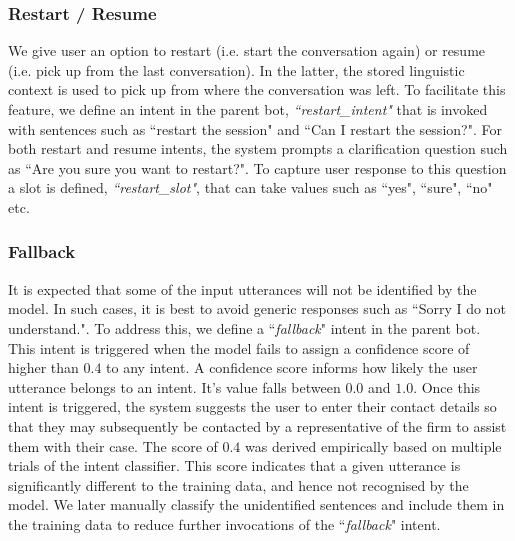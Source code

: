 \documentclass[runningheads]{llncs}
\begin{document}
\subsubsection{Restart / Resume}
We give user an option to restart (i.e. start the conversation again) or resume (i.e. pick up from the last conversation). In the latter, the stored linguistic context is used to pick up from where the conversation was left. To facilitate this feature, we define an intent in the parent bot, \textit{``restart\_intent"} that is invoked with sentences such as ``restart the session" and ``Can I restart the session?". For both restart and resume intents, the system prompts a clarification question such as ``Are you sure you want to restart?". To capture user response to this question a slot is defined, \textit{``restart\_slot"}, that can take values such as ``yes", ``sure", ``no" etc.

\subsubsection{Fallback}
It is expected that some of the input utterances will not be identified by the model. In such cases, it is best to avoid generic responses such as ``Sorry I do not understand.". To address this, we define a ``\textit{fallback}" intent in the parent bot. This intent is triggered when the model fails to assign a confidence score of higher than $0.4$ to any intent. A confidence score informs how likely the user utterance belongs to an intent. It's value falls between $0.0$ and $1.0$. Once this intent is triggered, the system suggests the user to enter their contact details so that they may subsequently be contacted by a representative of the firm to assist them with their case. The score of $0.4$ was derived empirically based on multiple trials of the \lex intent classifier. This score indicates that a given utterance is significantly different to the training data, and hence not recognised by the model. We later manually classify the unidentified sentences and include them in the training data to reduce further invocations of the ``\textit{fallback}" intent.
\end{document}

